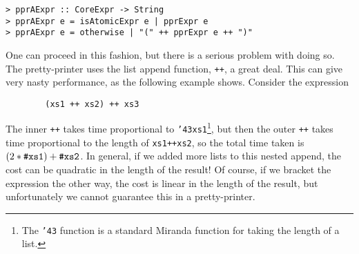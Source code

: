 \begin{verbatim}
> pprAExpr :: CoreExpr -> String
> pprAExpr e = isAtomicExpr e | pprExpr e
> pprAExpr e = otherwise | "(" ++ pprExpr e ++ ")"
\end{verbatim}
%
%
%
One can proceed in this
fashion, but there is a serious problem with doing so.
The pretty-printer uses the list append function, \mbox{\tt ++}, a great
deal.  This can give very nasty performance, as the following example shows.
Consider the expression
\begin{verbatim}
        (xs1 ++ xs2) ++ xs3
\end{verbatim}
The inner \mbox{\tt ++} takes time proportional to \mbox{\tt {\char'43}xs1}\footnote{%
The \mbox{\tt {\char'43}} function is a standard Miranda function for taking the
length of a list.
},
but then the
outer \mbox{\tt ++} takes time proportional to the length of \mbox{\tt xs1++xs2}, so the total
time taken is $(2*\mbox{\tt {\char'43}xs1}) + \mbox{\tt {\char'43}xs2}$.
In general, if we added more lists to this
nested append, the cost can be quadratic in the length of the result!
Of course, if we bracket the expression the other way, the cost is linear
in the length of the result, but unfortunately we cannot guarantee this
in a pretty-printer.

